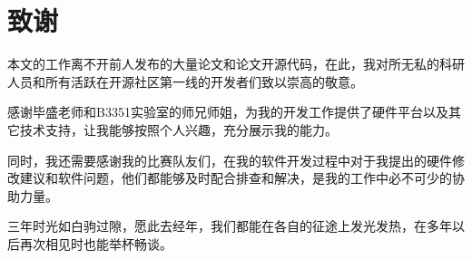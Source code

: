 \chapter{致\texorpdfstring{\quad}{}谢}

本文的工作离不开前人发布的大量论文和论文开源代码，在此，我对所无私的科研人员和所有活跃在开源社区第一线的开发者们致以崇高的敬意。

感谢毕盛老师和B3351实验室的师兄师姐，为我的开发工作提供了硬件平台以及其它技术支持，让我能够按照个人兴趣，充分展示我的能力。

同时，我还需要感谢我的比赛队友们，在我的软件开发过程中对于我提出的硬件修改建议和软件问题，他们都能够及时配合排查和解决，是我的工作中必不可少的协助力量。

三年时光如白驹过隙，愿此去经年，我们都能在各自的征途上发光发热，在多年以后再次相见时也能举杯畅谈。
